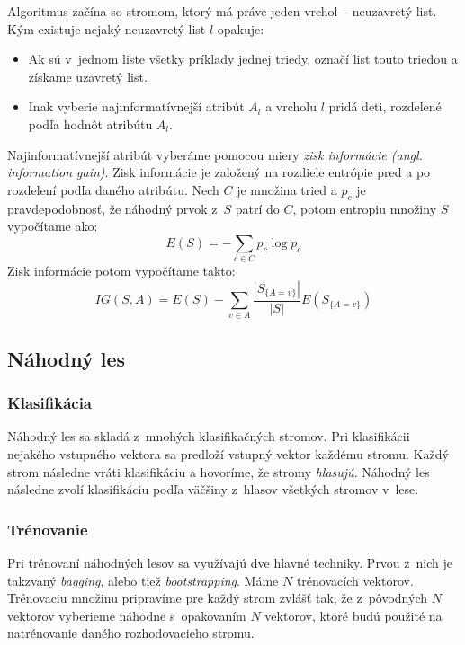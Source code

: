 Algoritmus začína so stromom, ktorý má práve jeden vrchol -- neuzavretý list. Kým existuje nejaký neuzavretý list $l$ opakuje:
\begin{itemize}
    \item Ak sú v~jednom liste všetky príklady jednej triedy, označí list touto triedou a získame uzavretý list.
    \item Inak vyberie najinformatívnejší atribút $A_l$ a vrcholu $l$ pridá deti, rozdelené podľa hodnôt atribútu $A_l$.
\end{itemize}

Najinformatívnejší atribút vyberáme pomocou miery \textit{zisk informácie (angl. information gain)}. Zisk informácie je založený na rozdiele entrópie pred a po rozdelení podľa daného atribútu. Nech $C$ je množina tried a $p_c$ je pravdepodobnosť, že náhodný prvok z~$S$ patrí do $C$, potom entropiu množiny $S$ vypočítame ako:
$$E(S) = -\sum_{c \in C} p_c\log{p_c}$$
Zisk informácie potom vypočítame takto:
$$IG(S,A) = E(S) - \sum_{v \in A} \frac{\left| S_{\{A=v\}} \right|}{\left| S \right|} E\left(S_{\{A=v\}}\right)$$

\subsection{Náhodný les}

\subsubsection{Klasifikácia}
Náhodný les sa skladá z~mnohých klasifikačných stromov. Pri klasifikácii nejakého vstupného vektora sa predloží vstupný vektor každému stromu. Každý strom následne vráti klasifikáciu a hovoríme, že stromy \textit{hlasujú}. Náhodný les následne zvolí klasifikáciu podľa väčšiny z~hlasov všetkých stromov v~lese.


\subsubsection{Trénovanie}

Pri trénovaní náhodných lesov sa využívajú dve hlavné techniky. Prvou z~nich je takzvaný \textit{bagging}, alebo tiež \textit{bootstrapping}. Máme $N$ trénovacích vektorov. Trénovaciu množinu pripravíme pre každý strom zvlášť tak, že z~pôvodných $N$ vektorov vyberieme náhodne s~opakovaním $N$ vektorov, ktoré budú použité na natrénovanie daného rozhodovacieho stromu.

